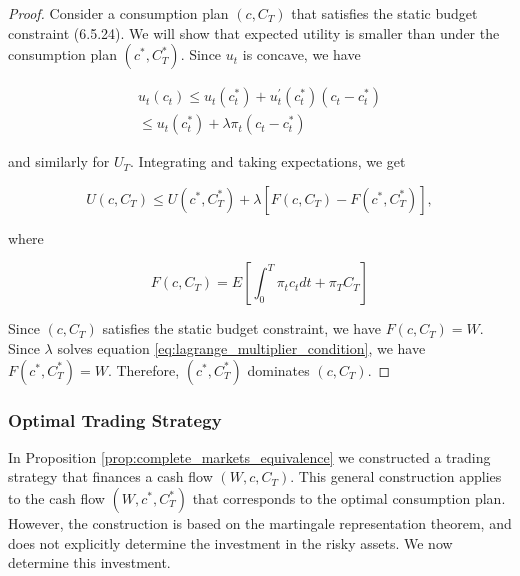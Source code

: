 \documentclass[\topdir/lecture\_notes.tex]{subfiles}
\begin{document}
\begin{proof}
Consider a consumption plan \(\left(c, C_{T}\right)\) that satisfies the static budget constraint (6.5.24). We will show that expected utility is smaller than under the consumption plan \(\left(c^{*}, C_{T}^{*}\right)\). Since \(u_{t}\) is concave, we have

\begin{equation*}
\begin{gathered}
u_{t}\left(c_{t}\right) \leq u_{t}\left(c_{t}^{*}\right)+u_{t}^{\prime}\left(c_{t}^{*}\right)\left(c_{t}-c_{t}^{*}\right) \\
\leq u_{t}\left(c_{t}^{*}\right)+\lambda \pi_{t}\left(c_{t}-c_{t}^{*}\right)
\end{gathered}
\end{equation*}

and similarly for \(U_{T}\). Integrating and taking expectations, we get

\begin{equation*}
U\left(c, C_{T}\right) \leq U\left(c^{*}, C_{T}^{*}\right)+\lambda\left[F\left(c, C_{T}\right)-F\left(c^{*}, C_{T}^{*}\right)\right],
\end{equation*}

where

\begin{equation*}
F\left(c, C_{T}\right)=E\left[\int_{0}^{T} \pi_{t} c_{t} d t+\pi_{T} C_{T}\right]
\end{equation*}

Since \(\left(c, C_{T}\right)\) satisfies the static budget constraint, we have \(F\left(c, C_{T}\right)=W\). Since \(\lambda\) solves equation \eqref{eq:lagrange_multiplier_condition}, we have \(F\left(c^{*}, C_{T}^{*}\right)=W\). Therefore, \(\left(c^{*}, C_{T}^{*}\right)\) dominates \(\left(c, C_{T}\right)\).
\end{proof}

\subsubsection{Optimal Trading Strategy}
In Proposition \ref{prop:complete_markets_equivalence} we constructed a trading strategy that finances a cash flow \(\left(W, c, C_{T}\right)\). This general construction applies to the cash flow \(\left(W, c^{*}, C_{T}^{*}\right)\) that corresponds to the optimal consumption plan. However, the construction is based on the martingale representation theorem, and does not explicitly determine the investment in the risky assets. We now determine this investment.
\end{document}
